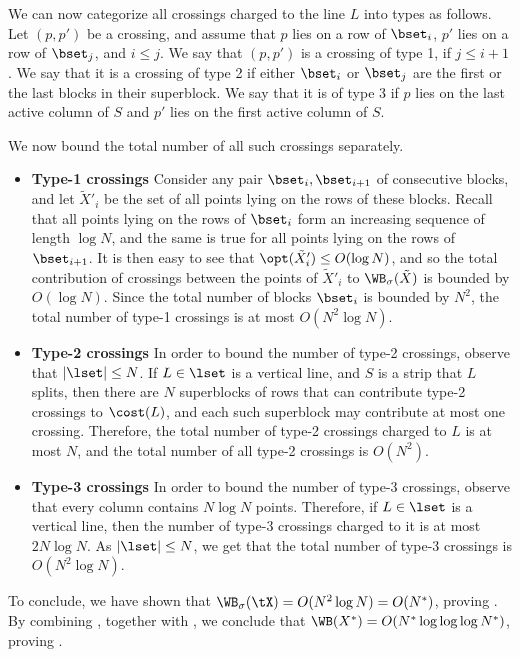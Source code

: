 We can now categorize all crossings charged to the line $L$ into types as follows. Let $(p,p')$ be a crossing, and assume that $p$ lies on a row of $\bset_i$, $p'$ lies on a row of $\bset_j$, and $i\leq j$. We say that $(p,p')$ is a crossing of type 1, if $j\leq i+1$. We say that 
it is a crossing of type 2 if either $\bset_i$ or $\bset_j$ are the first or the last blocks in their superblock. We say that it is of type 3 if $p$ lies on the last active column of $S$ and $p'$ lies on the first active column of $S$.

We now bound the total number of all such crossings separately.

\begin{itemize}
    \item {\bf Type-1 crossings}
Consider any pair $\bset_i,\bset_{i+1}$ of consecutive blocks, and let $\tilde X'_i$ be the set of all points lying on the rows of these blocks. Recall that all points lying on the rows of $\bset_i$ form an increasing sequence of length $\log N$, and the same is true for all points lying on the rows of $\bset_{i+1}$. It is then easy to see that $\opt(\tilde X'_i)\leq O(\log N)$, and so the total contribution of crossings between the points of $\tilde X'_i$ to $\WB_{\sigma}(\tilde X)$ is bounded by $O(\log N)$. Since the total number of blocks $\bset_i$ is bounded by $N^2$, the total number of type-1 crossings is at most $O(N^2\log N)$.

\item {\bf Type-2 crossings}
In order to bound the number of type-2 crossings, observe that $|\lset|\leq N$. If $L\in \lset$ is a vertical line, and $S$ is a strip that $L$ splits, then there are $N$ superblocks of rows that can contribute type-2 crossings to $\cost(L)$, and each such superblock may contribute at most one crossing. Therefore, the total number of type-2 crossings charged to $L$ is at most $N$, and the total number of all type-2 crossings is $O(N^2)$.

\item {\bf Type-3 crossings}
In order to bound the number of type-3 crossings, observe that every column contains $N\log N$ points. Therefore, if $L\in \lset$ is a vertical line, then the number of type-3 crossings charged to it is at most $2N\log N$. As $|\lset|\leq N$, we get that the total number of type-3 crossings is $O(N^2\log N)$.

\end{itemize}



To conclude, we have shown that $\WB_{\sigma}(\tX)=O(N^2\log N)=O(N^*)$, proving . By combining  , together with , we conclude that $\WB(X^*)=O(N^*\log\log\log N^*)$, proving .


